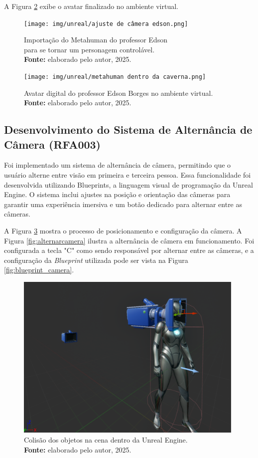 A Figura \ref{fig:metahumanEdsonn} exibe o avatar finalizado no ambiente virtual.

\begin{figure}[H]
        \centering
\texttt{[image: img/unreal/ajuste de câmera edson.png]}
        \caption{Importação do Metahuman do professor Edson \\ para se tornar um personagem controlável. \\
            \textbf{Fonte:} elaborado pelo autor, 2025.}
        \label{fig:metahumancamera}
\end{figure}

\begin{figure}[H]
        \centering
\texttt{[image: img/unreal/metahuman dentro da caverna.png]}
        \caption{Avatar digital do professor Edson Borges no ambiente virtual. \\
            \textbf{Fonte:} elaborado pelo autor, 2025.}
        \label{fig:metahumanEdsonn}
\end{figure}


\subsection{Desenvolvimento do Sistema de Alternância de Câmera (RFA003)}
Foi implementado um sistema de alternância de câmera, permitindo que o usuário alterne entre visão em primeira e terceira pessoa. Essa funcionalidade foi desenvolvida utilizando Blueprints, a linguagem visual de programação da Unreal Engine. O sistema inclui ajustes na posição e orientação das câmeras para garantir uma experiência imersiva e um botão dedicado para alternar entre as câmeras.

A Figura \ref{fig:config_camera} mostra o processo de posicionamento e configuração da câmera. A Figura \ref{fig:alternarcamera} ilustra a alternância de câmera em funcionamento.
Foi configurada a tecla "C"  como sendo responsável por alternar entre as câmeras, e a configuração da \textit{Blueprint} utilizada pode ser vista na Figura \ref{fig:blueprint_camera}.

\begin{figure}[H]
        \centering
        \includegraphics[height=8cm, keepaspectratio]{img/unreal/ajuste de câmera 1ºpessoa.png}
        \caption{Colisão dos objetos na cena dentro da Unreal Engine. \\
            \textbf{Fonte:} elaborado pelo autor, 2025.}
        \label{fig:config_camera}
\end{figure}

